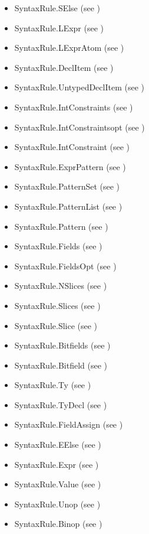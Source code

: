 \documentclass{book}
\begin{document}
\begin{itemize}
  \item SyntaxRule.SElse (see )
  \item SyntaxRule.LExpr (see )
  \item SyntaxRule.LExprAtom (see )
  \item SyntaxRule.DeclItem (see )
  \item SyntaxRule.UntypedDeclItem (see )
  \item SyntaxRule.IntConstraints (see )
  \item SyntaxRule.IntConstraintsopt (see )
  \item SyntaxRule.IntConstraint (see )
  \item SyntaxRule.ExprPattern (see )
  \item SyntaxRule.PatternSet (see )
  \item SyntaxRule.PatternList (see )
  \item SyntaxRule.Pattern (see )
  \item SyntaxRule.Fields (see )
  \item SyntaxRule.FieldsOpt (see )
  \item SyntaxRule.NSlices (see )
  \item SyntaxRule.Slices (see )
  \item SyntaxRule.Slice (see )
  \item SyntaxRule.Bitfields (see )
  \item SyntaxRule.Bitfield (see )
  \item SyntaxRule.Ty (see )
  \item SyntaxRule.TyDecl (see )
  \item SyntaxRule.FieldAssign (see )
  \item SyntaxRule.EElse (see )
  \item SyntaxRule.Expr (see )
  \item SyntaxRule.Value (see )
  \item SyntaxRule.Unop (see )
  \item SyntaxRule.Binop (see )
\end{itemize}
\end{document}
